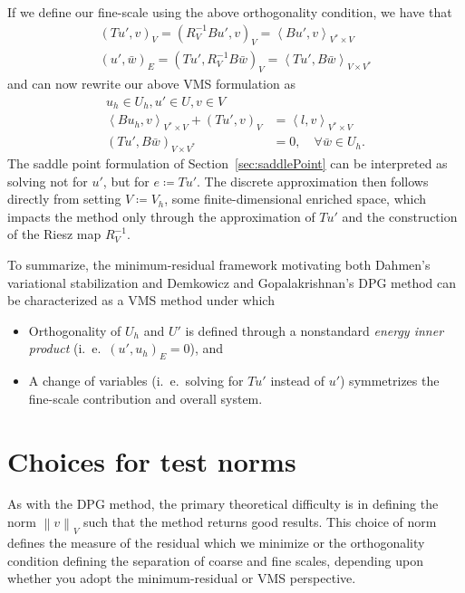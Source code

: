 \documentclass[final,leqno]{siamltex}
\newcommand{\nor}[1]{\left\| #1 \right\|}
\newcommand{\LRp}[1]{\left( #1 \right)}
\newcommand{\LRa}[1]{\left\langle #1 \right\rangle}
\begin{document}
If we define our fine-scale using the above orthogonality condition, we have that
\begin{align*}
\LRp{Tu',v}_V = \LRp{R_V^{-1}Bu',v}_V = \LRa{Bu',v}_{V^*\times V}\\
\LRp{u',\bar{w}}_E = \LRp{Tu',R_V^{-1}B\bar{w}}_V = \LRa{Tu',B\bar{w}}_{V\times V^*}
\end{align*}
and can now rewrite our above VMS formulation as 
\begin{align*}
u_h \in U_h, u' \in U, v \in V\\
\LRa{Bu_h,v}_{V^*\times V} + \LRp{Tu',v}_{V} &= \LRa{l,v}_{V^*\times V}\\
\LRp{Tu',B\bar{w}}_{V\times V^*} &= 0, \quad \forall \bar{w} \in U_h.
\end{align*}
The saddle point formulation of Section~\ref{sec:saddlePoint} can be interpreted as solving not for $u'$, but for $e\coloneqq Tu'$.  The discrete approximation then follows directly from setting $V \coloneqq V_h$, some finite-dimensional enriched space, which impacts the method only through the approximation of $Tu'$ and the construction of the Riesz map $R_V^{-1}$.  

To summarize, the minimum-residual framework motivating both Dahmen's variational stabilization and Demkowicz and Gopalakrishnan's DPG method can be characterized as a VMS method under which 
\begin{itemize}
\item Orthogonality of $U_h$ and $U'$ is defined through a nonstandard \textit{energy inner product} (i.\ e.\ $\LRp{u',u_h}_E = 0$), and
\item A change of variables (i.\ e.\ solving for $Tu'$ instead of $u'$) symmetrizes the fine-scale contribution and overall system.
\end{itemize}

\section{Choices for test norms}

As with the DPG method, the primary theoretical difficulty is in defining the norm $\nor{v}_V$ such that the method returns good results.  This choice of norm defines the measure of the residual which we minimize or the orthogonality condition defining the separation of coarse and fine scales, depending upon whether you adopt the minimum-residual or VMS perspective.  
\end{document}
